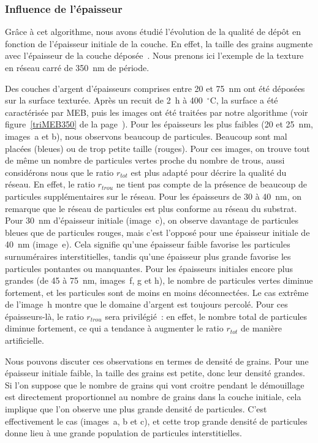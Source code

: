 	\subsubsection{Influence de l'épaisseur}
Grâce à cet algorithme, nous avons étudié l'évolution de la qualité de dépôt en fonction de l'épaisseur initiale de la couche. En effet, la taille des grains augmente avec l'épaisseur de la couche déposée~\cite{hillert1965theory, thompson1990grain}. Nous prenons ici l'exemple de la texture en réseau carré de 350~nm de période.\par 
Des couches d'argent d'épaisseurs comprises entre 20 et 75~nm ont été déposées sur la surface texturée. Après un recuit de 2~h à 400~$^\circ$C, la surface a été caractérisée par MEB, puis les images ont été traitées par notre algorithme (voir figure~\ref{triMEB350} de la page~\pageref{triMEB350}). Pour les épaisseurs les plus faibles (20 et 25~nm, images~a et b), nous observons beaucoup de particules. Beaucoup sont mal placées (bleues) ou de trop petite taille (rouges). Pour ces images, on trouve tout de même un nombre de particules vertes proche du nombre de trous, aussi considérons nous que le ratio $r_{tot}$ est plus adapté pour décrire la qualité du réseau. En effet, le ratio $r_{trou}$ ne tient pas compte de la présence de beaucoup de particules supplémentaires sur le réseau. Pour les épaisseurs de 30 à 40~nm, on remarque que le réseau de particules est plus conforme au réseau du substrat. Pour 30~nm d'épaisseur initiale (image~c), on observe davantage de particules bleues que de particules rouges, mais c'est l'opposé pour une épaisseur initiale de 40~nm (image~e). Cela signifie qu'une épaisseur faible favorise les particules surnuméraires interstitielles, tandis qu'une épaisseur plus grande favorise les particules pontantes ou manquantes. Pour les épaisseurs initiales encore plus grandes (de 45 à 75~nm, images~f, g et h), le nombre de particules vertes diminue fortement, et les particules sont de moins en moins déconnectées. Le cas extrême de l'image~h montre que le domaine d'argent est toujours percolé. Pour ces épaisseurs-là, le ratio $r_{trou}$ sera privilégié~: en effet, le nombre total de particules diminue fortement, ce qui a tendance à augmenter le ratio $r_{tot}$ de manière artificielle.\par 
Nous pouvons discuter ces observations en termes de densité de grains. Pour une épaisseur initiale faible, la taille des grains est petite, donc leur densité grandes. Si l'on suppose que le nombre de grains qui vont croitre pendant le démouillage est directement proportionnel au nombre de grains dans la couche initiale, cela implique que l'on observe une plus grande densité de particules. C'est effectivement le cas (images~a, b et c), et cette trop grande densité de particules donne lieu à une grande population de particules interstitielles.\par 

